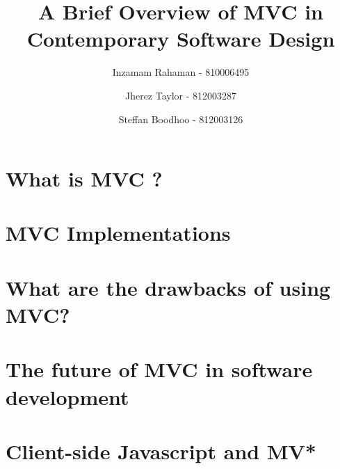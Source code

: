 \documentclass[
oneside,
openany,
12pt, a4paper,
footinclude=true,
headinclude=true,
cleardoublepage=empty
]{scrbook}
\title{A Brief Overview of MVC in Contemporary Software Design}
\author{Inzamam Rahaman - 810006495 \and Jherez Taylor - 812003287 \and Steffan Boodhoo - 812003126 }
\begin{document}
  \maketitle

  
  


  \chapter{What is MVC ?}
  

  \chapter{MVC Implementations}
  

  \chapter{What are the drawbacks of using MVC?}
  

  \chapter{The future of MVC in software development}
  

  \chapter{Client-side Javascript and MV*}
  
\end{document}
